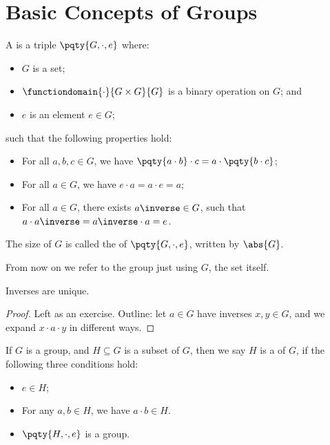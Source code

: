 \section{Basic Concepts of Groups}

\begin{definition}[Group]
    \label{def:group}%
    A  is a triple \(\pqty{G, \cdot, e}\) where:
    \begin{itemize}
        \item \(G\) is a set;
        \item \(\functiondomain{\cdot}{G \times G}{G}\) is a binary operation on \(G\); and
        \item \(e\) is an element \(e \in G\);
    \end{itemize}
    such that the following properties hold:
    \begin{itemize}
        \item {} For all \(a, b, c \in G\), we have \(\pqty{a \cdot b} \cdot c = a \cdot \pqty{b \cdot c}\);
        \item {} For all \(a \in G\), we have \(e \cdot a = a \cdot e = a\);
        \item {} For all \(a \in G\), there exists \(a \inverse \in G\), such that \(a \cdot a \inverse = a \inverse \cdot a = e\).
    \end{itemize}

    The size of \(G\) is called the  of \(\pqty{G, \cdot, e}\), written by \(\abs{G}\).
\end{definition}

From now on we refer to the group just using \(G\), the set itself.

\begin{proposition}
    \label{prop:inverses-unique}%
    Inverses are unique.
\end{proposition}

\begin{proof}
    Left as an exercise. Outline: let \(a \in G\) have inverses \(x, y \in G\), and we expand \(x \cdot a \cdot y\) in different ways.
\end{proof}

\begin{definition}[Subgroup]
    \label{def:subgroup}%
    If \(G\) is a group, and \(H \subseteq G\) is a subset of \(G\), then we say \(H\) is a  of \(G\), if the following three conditions hold:
    \begin{itemize}
        \item {} \(e \in H\);
        \item {} For any \(a, b \in H\), we have \(a \cdot b \in H\).
        \item {} \(\pqty{H, \cdot, e}\) is a group.
    \end{itemize}
\end{definition}

